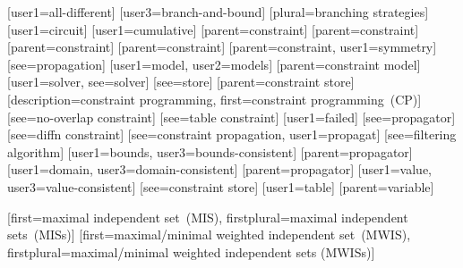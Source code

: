[user1={all-different}]
[user3={branch-and-bound}]
[plural={branching strategies}]
[user1={circuit}]
[user1={cumulative}]
[parent={constraint}]
[parent={constraint}]
[parent={constraint}]
[parent={constraint}]
%
        [parent={constraint}, user1={symmetry}]
[see={propagation}]
[user1={model}, user2={models}]
[parent={constraint model}]
[user1={solver}, see={solver}]
[see={store}]
[parent={constraint store}]
%
        [description={constraint programming},
         first={constraint programming~(CP)}]
[see={no-overlap constraint}]
[see={table constraint}]
[user1={failed}]
[see={propagator}]
[see={diffn constraint}]
[see={constraint propagation}, user1={propagat}]
[see={filtering algorithm}]
[user1={bounds}, user3={bounds-consistent}]
[parent={propagator}]
[user1={domain}, user3={domain-consistent}]
[parent={propagator}]
[user1={value}, user3={value-consistent}]
[see={constraint store}]
[user1={table}]
[parent={variable}]




%
        [first={maximal independent set~(MIS)},
         firstplural={maximal independent sets~(MISs)}]
%
        [first={maximal/minimal weighted independent set~(MWIS)},
         firstplural={maximal/minimal weighted independent sets (MWISs)}]

